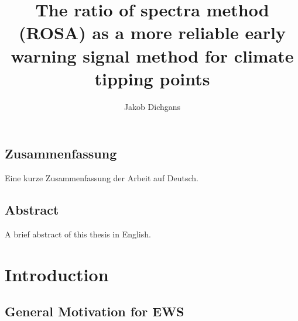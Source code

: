 \documentclass[%
thesis=student,%
coverpage=false,%
titlepage=false,%
headmarks=true, %
english,%
font=libertine, %
math=newpxtx, %
BCOR=5mm,%
coverBCOR=11mm%
]{tumbook}
\title{The ratio of spectra method (ROSA) as a more reliable early warning signal method for climate tipping points}
\author{Jakob Dichgans}
\begin{document}
\frontmatter
\maketitle

\section*{Zusammenfassung}
Eine kurze Zusammenfassung der Arbeit auf Deutsch.

\section*{Abstract}
A brief abstract of this thesis in English.

\cleardoublepage{}

\tableofcontents

\mainmatter{}
\chapter{Introduction}

\section{General Motivation for EWS}%
\label{sec:General  Motivation for EWS}
\end{document}
